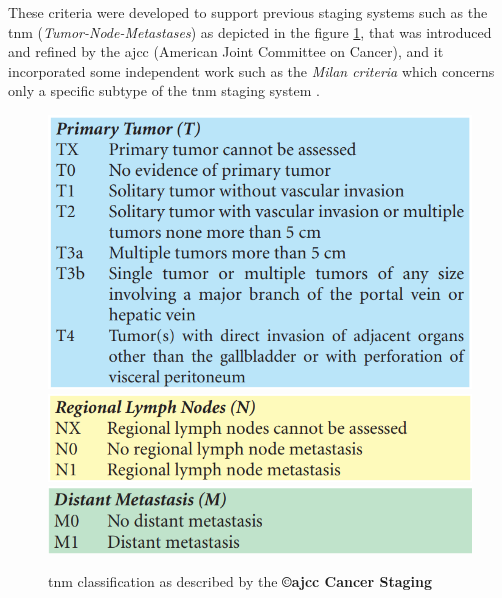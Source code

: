 These criteria were developed to support previous staging systems such
as the \ac{tnm} (\emph{Tumor-Node-Metastases}) as depicted in the figure \ref{TNM}, that was introduced and refined by
the \ac{ajcc} (American Joint Committee on Cancer), and it incorporated some independent work such as the
\emph{Milan criteria} which concerns only a specific subtype of the
\ac{tnm} staging system \cite{Mazzaferro1996}.


\begin{figure}[ht!]
\centering
\includegraphics[width=0.4\linewidth]{images/image2} \\
\includegraphics[width=0.4\linewidth]{images/image11} \\
\includegraphics[width=0.4\linewidth]{images/image14} \\
\caption{\ac{tnm} classification as described by the \textbf{©\ac{ajcc} Cancer Staging \cite{Edge2010}}}
\label{TNM}
\end{figure}

